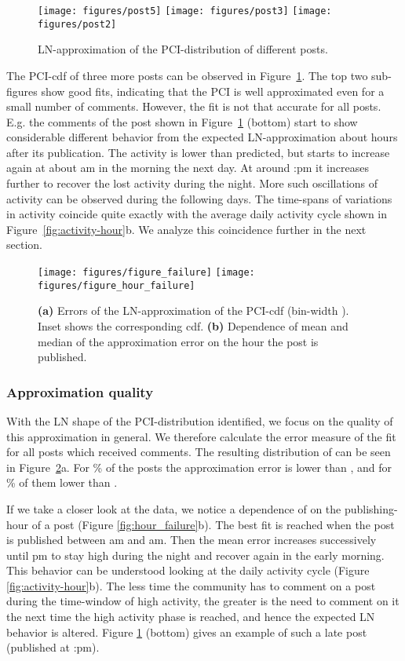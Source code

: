 \documentclass[twoside,11pt]{article}
\begin{document}
\begin{figure}[!tb]\centering
  \texttt{[image: figures/post5]}
  \texttt{[image: figures/post3]}
  \texttt{[image: figures/post2]}
  \caption{LN-approximation of the PCI-distribution of 
    different posts.}
\label{fig:posts}
\end{figure}

The PCI-cdf of three more posts can be observed in
Figure~\ref{fig:posts}. The top two sub-figures show good fits,
indicating that the PCI is well approximated even for a small number
of comments.  However, the fit is not that accurate for all posts.
E.g. the comments of the post shown in Figure~\ref{fig:posts} (bottom)
start to show considerable different behavior from the expected
LN-approximation about  hours after its publication.  The activity
is lower than predicted, but starts to increase again at about am
in the morning the next day. At around :pm it increases further
to recover the lost activity during the night. More such oscillations
of activity can be observed during the following days. The time-spans
of variations in activity coincide quite exactly with the average
daily activity cycle shown in Figure~\ref{fig:activity-hour}b.  We
analyze this coincidence further in the next section.
 \begin{figure}[!t]\centering
   \texttt{[image: figures/figure\_failure]}
   \texttt{[image: figures/figure\_hour\_failure]}
   \caption{\textbf{(a)} Errors  of the LN-approximation of
     the PCI-cdf (bin-width ). Inset shows the corresponding
     cdf.  
     \textbf{(b)} Dependence of mean and median of the approximation
     error  on the hour the post is published.}
\label{fig:hour_failure}
\label{fig:hist_failure}
\end{figure}
\subsubsection{Approximation quality}\noindent
With the LN shape of the PCI-distribution identified, we focus on the
quality of this approximation in general.  We therefore calculate the
error measure  of the fit for all posts which received
comments.  The resulting distribution of  can be seen in
Figure~\ref{fig:hist_failure}a.  For \% of the posts the
approximation error  is lower than , and for \% of
them lower than .

If we take a closer look at the data, we notice a dependence of
 on the publishing-hour of a post (Figure
\ref{fig:hour_failure}b).  The best fit is reached when the post is
published between am and am. Then the mean error increases
successively until pm to stay high during the night and recover
again in the early morning. This behavior can be understood looking at
the daily activity cycle (Figure \ref{fig:activity-hour}b).  The less
time the community has to comment on a post during the time-window of
high activity, the greater is the need to comment on it the next time
the high activity phase is reached, and hence the expected LN behavior
is altered. Figure \ref{fig:posts} (bottom) gives an example of such a
late post (published at :pm).
\end{document}
